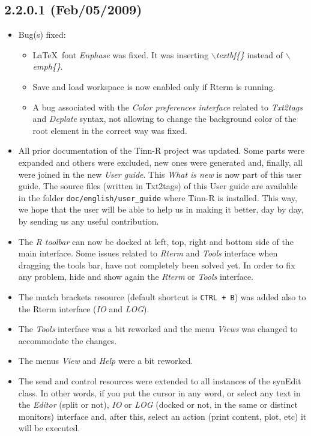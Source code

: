 \subsection*{2.2.0.1 (Feb/05/2009)}
\begin{itemize}
  \item Bug(s) fixed:
    \begin{itemize}
      \item \LaTeX ~font \textit{Enphase} was fixed. It was inserting
        \textit{$\backslash$textbf\{\}} instead of
        \textit{$\backslash$emph\{\}}.
      \item Save and load workspace is now enabled only if Rterm is
        running.
      \item A bug associated with the \textit{Color preferences interface}
        related to \textit{Txt2tags} and \textit{Deplate} syntax, not
        allowing to change the background color of the root element in
        the correct way was fixed.
    \end{itemize}
  \item All prior documentation of the Tinn-R project was updated. Some
    parts were expanded and others were excluded, new ones were generated and,
    finally, all were joined in the new \textit{User guide}. This
    \textit{What is new} is now part of this user guide. The source
    files (written in Txt2tags) of this User guide are available in the
    folder \texttt{doc/english/user\_guide} where Tinn-R is installed.
    This way, we hope that the user will be able to help us in making
    it better, day by day, by sending us any useful contribution.
  \item The \textit{R toolbar} can now be docked at left, top, right and
    bottom side of the main interface. Some issues related to \textit{Rterm}
    and \textit{Tools} interface when dragging the \RR{} tools bar, have
    not completely been solved yet. In order to fix any problem, hide and
    show again the \textit{Rterm} or \textit{Tools} interface.
  \item The match brackets resource (default shortcut is \texttt{CTRL + B})
    was added also to the Rterm interface (\textit{IO} and \textit{LOG}).
  \item The \textit{Tools} interface was a bit reworked and the menu
    \textit{Views} was changed to accommodate the changes.
  \item The menus \textit{View} and \textit{Help} were a bit reworked.
  \item The send and control \RR{} resources were extended to all
    instances of the synEdit class. In other words, if you put the
    cursor in any word, or select any text in the \textit{Editor}
    (split or not), \textit{IO} or \textit{LOG} (docked or not, in the
    same or distinct monitors) interface and, after this, select an
    action (print content, plot, etc) it will be executed.
\end{itemize}
